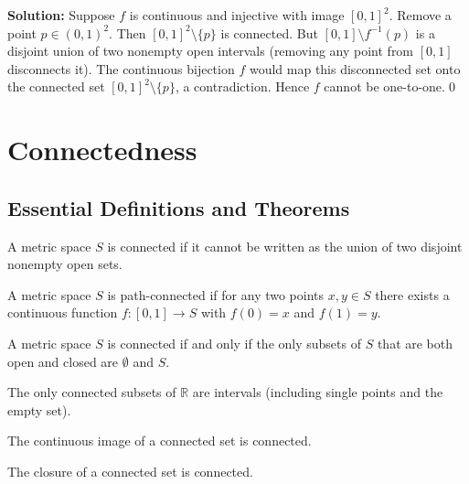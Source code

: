 \bigskip\noindent\textbf{Solution:}
Suppose $f$ is continuous and injective with image $[0,1]^2$. Remove a point $p\in(0,1)^2$. Then $[0,1]^2\setminus\{p\}$ is connected. But $[0,1]\setminus f^{-1}(p)$ is a disjoint union of two nonempty open intervals (removing any point from $[0,1]$ disconnects it). The continuous bijection $f$ would map this disconnected set onto the connected set $[0,1]^2\setminus\{p\}$, a contradiction. Hence $f$ cannot be one-to-one.\qed

\section{Connectedness}

\subsection*{Essential Definitions and Theorems}

\begin{definition}
A metric space $S$ is connected if it cannot be written as the union of two disjoint nonempty open sets.
\end{definition}

\begin{definition}
A metric space $S$ is path-connected if for any two points $x,y \in S$ there exists a continuous function $f: [0,1] \to S$ with $f(0) = x$ and $f(1) = y$.
\end{definition}

\begin{theorem}
A metric space $S$ is connected if and only if the only subsets of $S$ that are both open and closed are $\emptyset$ and $S$.
\end{theorem}

\begin{theorem}
The only connected subsets of $\mathbb{R}$ are intervals (including single points and the empty set).
\end{theorem}

\begin{theorem}
The continuous image of a connected set is connected.
\end{theorem}

\begin{theorem}
The closure of a connected set is connected.
\end{theorem}



